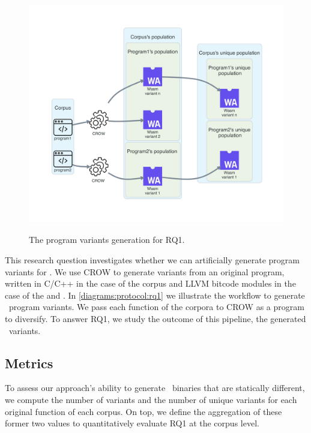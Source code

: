 
\section{\rqone}
\label{rq1:method}

\begin{figure}[h]
    \centering
    \includegraphics[height=4.1in]{diagrams/RQ1.pdf}
    \caption{The program variants generation for RQ1.}
    \label{diagrams:protocol:rq1}
\end{figure}


This research question investigates whether we can artificially generate program variants for \wasm. We use CROW to generate variants from an original program, written in C/C++ in the case of the \corpusrosetta corpus and LLVM bitcode modules in the case of the \corpussodium and \corpusqrcode. 
In \autoref{diagrams:protocol:rq1} we illustrate the workflow to generate \wasm\ program variants. We pass each function of the corpora to CROW as a program to diversify. To answer RQ1, we study the outcome of this pipeline, the generated \wasm\ variants. 


\subsection*{Metrics}

To assess our approach's ability to generate \wasm\ binaries that are statically different, we compute the number of variants and the number of unique variants for each original function of each corpus. 
On top, we define the aggregation of these former two values to quantitatively evaluate RQ1 at the corpus level. 

